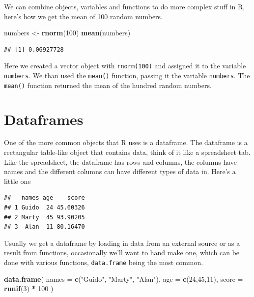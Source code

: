 \documentclass[
]{book}
\newenvironment{Shaded}{\begin{snugshade}}{\end{snugshade}}
\newcommand{\DataTypeTok}[1]{\textcolor[rgb]{0.13,0.29,0.53}{#1}}
\newcommand{\DecValTok}[1]{\textcolor[rgb]{0.00,0.00,0.81}{#1}}
\newcommand{\KeywordTok}[1]{\textcolor[rgb]{0.13,0.29,0.53}{\textbf{#1}}}
\newcommand{\NormalTok}[1]{#1}
\newcommand{\OperatorTok}[1]{\textcolor[rgb]{0.81,0.36,0.00}{\textbf{#1}}}
\newcommand{\StringTok}[1]{\textcolor[rgb]{0.31,0.60,0.02}{#1}}
\begin{document}
We can combine objects, variables and functions to do more complex stuff in R, here's how we get the mean of 100 random numbers.

\begin{Shaded}
\begin{Highlighting}[]
\NormalTok{numbers <-}\StringTok{ }\KeywordTok{rnorm}\NormalTok{(}\DecValTok{100}\NormalTok{)}
\KeywordTok{mean}\NormalTok{(numbers)}
\end{Highlighting}
\end{Shaded}

\begin{verbatim}
## [1] 0.06927728
\end{verbatim}

Here we created a vector object with \texttt{rnorm(100)} and assigned it to the variable \texttt{numbers}. We than used the \texttt{mean()} function, passing it the variable \texttt{numbers}. The \texttt{mean()} function returned the mean of the hundred random numbers.

\hypertarget{dataframes}{%
\section{Dataframes}\label{dataframes}}

One of the more common objects that R uses is a dataframe. The dataframe is a rectangular table-like object that contains data, think of it like a spreadsheet tab. Like the spreadsheet, the dataframe has rows and columns, the columns have names and the different columns can have different types of data in. Here's a little one

\begin{verbatim}
##   names age    score
## 1 Guido  24 45.60326
## 2 Marty  45 93.90205
## 3  Alan  11 80.16470
\end{verbatim}

Usually we get a dataframe by loading in data from an external source or as a result from functions, occasionally we'll want to hand make one, which can be done with various functions, \texttt{data.frame} being the most common.

\begin{Shaded}
\begin{Highlighting}[]
\KeywordTok{data.frame}\NormalTok{(}
  \DataTypeTok{names =} \KeywordTok{c}\NormalTok{(}\StringTok{"Guido"}\NormalTok{, }\StringTok{"Marty"}\NormalTok{, }\StringTok{"Alan"}\NormalTok{),}
  \DataTypeTok{age =} \KeywordTok{c}\NormalTok{(}\DecValTok{24}\NormalTok{,}\DecValTok{45}\NormalTok{,}\DecValTok{11}\NormalTok{),}
  \DataTypeTok{score =} \KeywordTok{runif}\NormalTok{(}\DecValTok{3}\NormalTok{) }\OperatorTok{*}\StringTok{ }\DecValTok{100}
\NormalTok{)}
\end{Highlighting}
\end{Shaded}
\end{document}

